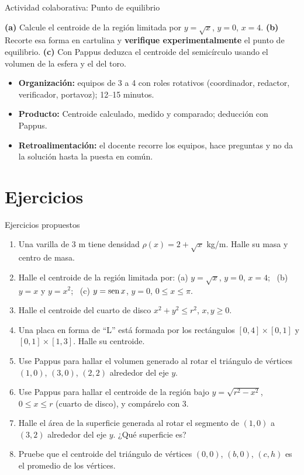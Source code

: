 \documentclass[10pt,aspectratio=169]{beamer}
\begin{document}
\begin{frame}{Actividad colaborativa: Punto de equilibrio}
  \small
  \begin{activa}
    \textbf{(a)} Calcule el centroide de la región limitada por $y=\sqrt x$, $y=0$, $x=4$. \textbf{(b)} Recorte esa forma en cartulina y \textbf{verifique experimentalmente} el punto de equilibrio. \textbf{(c)} Con Pappus deduzca el centroide del semicírculo usando el volumen de la esfera y el del toro.
  \end{activa}
  \begin{itemize}
    \item \textbf{Organización:} equipos de 3 a 4 con roles rotativos (coordinador, redactor, verificador, portavoz); 12--15 minutos.
    \item \textbf{Producto:} Centroide calculado, medido y comparado; deducción con Pappus.
    \item \textbf{Retroalimentación:} el docente recorre los equipos, hace preguntas y no da la solución hasta la puesta en común.
  \end{itemize}
\end{frame}

\section{Ejercicios}

\begin{frame}{Ejercicios propuestos}
  \small
  \begin{ejercicio}
    \begin{enumerate}
      \item Una varilla de 3 m tiene densidad $\rho(x)=2+\sqrt x$ kg/m. Halle su masa y centro de masa.
      \item Halle el centroide de la región limitada por: (a) $y=\sqrt x$, $y=0$, $x=4$; \ (b) $y=x$ y $y=x^2$;
        \ (c) $y=\operatorname{sen} x$, $y=0$, $0\le x\le\pi$.
      \item Halle el centroide del cuarto de disco $x^2+y^2\le r^2$, $x,y\ge0$.
      \item Una placa en forma de ``L'' está formada por los rectángulos $[0,4]\times[0,1]$ y $[0,1]\times[1,3]$. Halle su centroide.
      \item Use Pappus para hallar el volumen generado al rotar el triángulo de vértices $(1,0)$, $(3,0)$, $(2,2)$ alrededor del eje $y$.
      \item Use Pappus para hallar el centroide de la región bajo $y=\sqrt{r^2-x^2}$, $0\le x\le r$ (cuarto de disco), y compárelo con 3.
      \item Halle el área de la superficie generada al rotar el segmento de $(1,0)$ a $(3,2)$ alrededor del eje $y$. ¿Qué superficie es?
      \item Pruebe que el centroide del triángulo de vértices $(0,0)$, $(b,0)$, $(c,h)$ es el promedio de los vértices.
    \end{enumerate}
  \end{ejercicio}
\end{frame}
\end{document}
